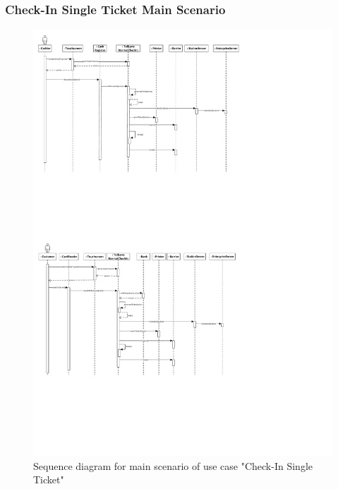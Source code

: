 \subsubsection{Check-In Single Ticket Main Scenario}

\begin{figure}
\centerline{\includegraphics[width=1.4\columnwidth]{"img/sequence_diagrams/SequenceDiagram_CheckInSingleTicket_cash"}}
\caption{Sequence diagram for main scenario of use case "Check-In Single Ticket"}
\label{fig:seq_single_ticket_main}
\end{figure}

